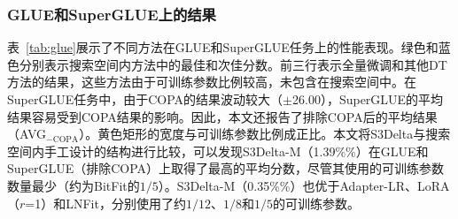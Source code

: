 
\subsubsection{GLUE和SuperGLUE上的结果}
\label{sec:resultsonglue}
表~\ref{tab:glue}展示了不同方法在GLUE和SuperGLUE任务上的性能表现。\colorbox{themegreen}{绿色}和\colorbox{themeblue}{蓝色}分别表示搜索空间内方法中的最佳和次佳分数。前三行表示全量微调和其他DT方法的结果，这些方法由于可训练参数比例较高，未包含在搜索空间中。在SuperGLUE任务中，由于COPA的结果波动较大（$\pm$26.00），SuperGLUE的平均结果容易受到COPA结果的影响。因此，本文还报告了排除COPA后的平均结果（AVG$_{-\text{COPA}}$）。黄色矩形的宽度与可训练参数比例成正比。本文将S3Delta与搜索空间内手工设计的结构进行比较，可以发现S3Delta-M（1.39\%\%）在GLUE和SuperGLUE（排除COPA）上取得了最高的平均分数，尽管其使用的可训练参数数量最少（约为BitFit的$1/5$）。S3Delta-M（0.35\%\%）也优于Adapter-LR、LoRA（$r$=1）和LNFit，分别使用了约$1/12$、$1/8$和$1/5$的可训练参数。

